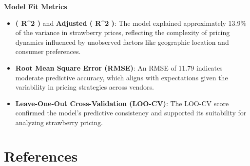 \documentclass[
  letterpaper,
  DIV=11,
  numbers=noendperiod]{scrartcl}
\begin{document}
\textbf{Model Fit Metrics}

\begin{itemize}
\item
  \textbf{( R\^{}2 )} and \textbf{Adjusted ( R\^{}2 )}: The model
  explained approximately 13.9\% of the variance in strawberry prices,
  reflecting the complexity of pricing dynamics influenced by unobserved
  factors like geographic location and consumer preferences.
\item
  \textbf{Root Mean Square Error (RMSE)}: An RMSE of 11.79 indicates
  moderate predictive accuracy, which aligns with expectations given the
  variability in pricing strategies across vendors.
\item
  \textbf{Leave-One-Out Cross-Validation (LOO-CV)}: The LOO-CV score
  confirmed the model's predictive consistency and supported its
  suitability for analyzing strawberry pricing.
\end{itemize}

\newpage

\section*{References}\label{references}
\end{document}
